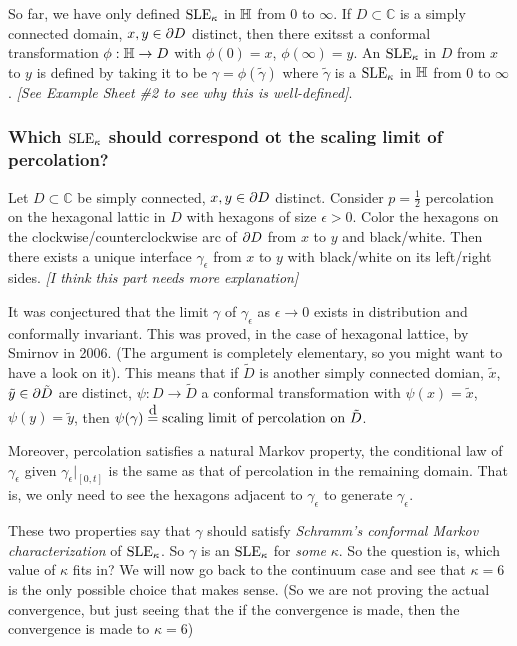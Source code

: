 \documentclass[12pt,a4paper]{article}
\newcommand\xeq{\stackrel{\mathclap{\normalfont\mbox{d}}}{=}}
\begin{document}
So far, we have only defined $\text{SLE}_{\kappa}$ in $\mathbb{H}$ from $0$ to $\infty$. If $D\subset \mathbb{C}$ is a simply connected domain, $x,y \in \partial D$ distinct, then there exitsst a conformal transformation $\phi : \mathbb{H} \rightarrow D$ with $\phi(0)=x$, $\phi(\infty) = y$. An $\text{SLE}_{\kappa}$ in $D$ from $x$ to $y$ is defined by taking it to be $\gamma = \phi(\tilde{\gamma})$ where $\tilde{\gamma}$ is a $\text{SLE}_{\kappa}$ in $\mathbb{H}$ from $0$ to $\infty$. \emph{[See Example Sheet \#2 to see why this is well-defined]}.

\subsubsection*{Which $\text{SLE}_{\kappa}$ should correspond ot the scaling limit of percolation?}

Let $D\subset \mathbb{C}$ be simply connected, $x, y \in \partial D$ distinct. Consider $p= \frac{1}{2}$ percolation on the hexagonal lattic in $D$ with hexagons of size $\epsilon >0$. Color the hexagons on the clockwise/counterclockwise arc of $\partial D$ from $x$ to $y$ and black/white. Then there exists a unique interface $\gamma_{\epsilon}$ from $x$ to $y$ with black/white on its left/right sides. \emph{[I think this part needs more explanation]}

\quad It was conjectured that the limit $\gamma$ of $\gamma_{\epsilon}$ as $\epsilon \rightarrow 0$ exists in distribution and conformally invariant. This was proved, in the case of hexagonal lattice, by Smirnov in 2006. (The argument is completely elementary, so you might want to have a look on it). This means that if $\tilde{D}$ is another simply connected domian, $\tilde{x}$, $\tilde{y} \in \partial \tilde{D}$ are distinct, $\psi : D\rightarrow \tilde{D}$ a conformal transformation with $\psi(x) = \tilde{x}$, $\psi(y) = \tilde{y}$, then $\psi(\gamma) \xeq \text{scaling limit of percolation on } \tilde{D}$.  

\quad Moreover, percolation satisfies a natural Markov property, the conditional law of $\gamma_{\epsilon}$ given $\gamma_{\epsilon}|_{[0,t]}$ is the same as that of percolation in the remaining domain. That is, we only need to see the hexagons adjacent to $\gamma_{\epsilon}$ to generate $\gamma_{\epsilon}$.

\quad These two properties say that $\gamma$ should satisfy \emph{Schramm's conformal Markov characterization} of $\text{SLE}_{\kappa}$. So $\gamma$ is an $\text{SLE}_{\kappa}$ for \emph{some} $\kappa$. So the question is, which value of $\kappa$ fits in? We will now go back to the continuum case and see that $\kappa =6$ is the only possible choice that makes sense. (So we are not proving the actual convergence, but just seeing that the if the convergence is made, then the convergence is made to $\kappa=6$)
\s
\end{document}
